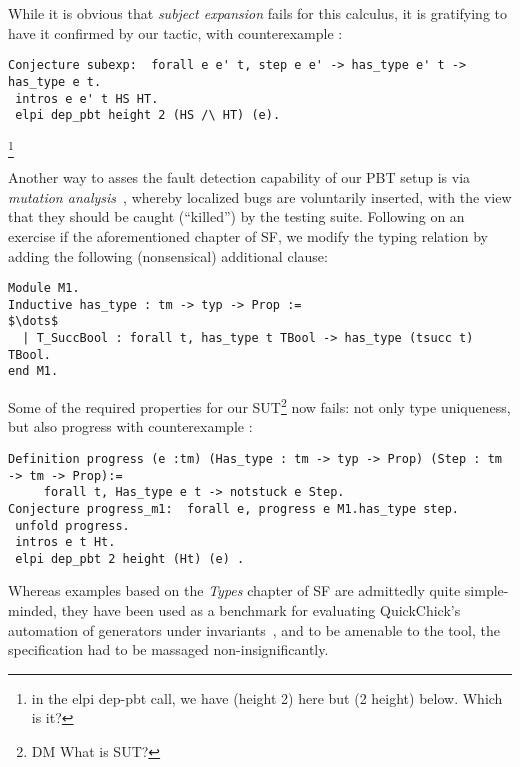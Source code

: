 While it is obvious that \emph{subject expansion} fails for this calculus, it is gratifying to have it confirmed by our tactic, with counterexample :
\begin{lstlisting}
Conjecture subexp:  forall e e' t, step e e' -> has_type e' t -> has_type e t. 
 intros e e' t HS HT.
 elpi dep_pbt height 2 (HS /\ HT) (e).
\end{lstlisting}
\footnote{in the elpi dep-pbt call, we have (height 2) here but (2
  height) below.  Which is it?}

Another way to asses the fault detection capability of our PBT setup is via \emph{mutation analysis}~\cite{CavadaCM20}, whereby localized bugs are voluntarily inserted, with the view that they should be caught (``killed'') by the testing suite. Following on  an exercise if the aforementioned chapter of SF, we modify the typing relation by adding the following (nonsensical) additional clause:

\begin{lstlisting}
Module M1.
Inductive has_type : tm -> typ -> Prop :=
$\dots$
  | T_SuccBool : forall t, has_type t TBool -> has_type (tsucc t) TBool.
end M1.
\end{lstlisting}
Some of the required properties for our SUT\footnote{DM What is SUT?} now fails: not
only type uniqueness, but also progress with counterexample :
\begin{lstlisting}
Definition progress (e :tm) (Has_type : tm -> typ -> Prop) (Step : tm -> tm -> Prop):= 
     forall t, Has_type e t -> notstuck e Step.
Conjecture progress_m1:  forall e, progress e M1.has_type step.
 unfold progress.
 intros e t Ht.    
 elpi dep_pbt 2 height (Ht) (e) .  
\end{lstlisting}

Whereas examples based on the \emph{Types} chapter of SF are
admittedly quite simple-minded, they have been used as a benchmark for
evaluating \textsf{QuickChick}'s automation of generators under
invariants~\cite{LampropoulosPP18}, and to be amenable to the tool,
the specification had to be massaged non-insignificantly.

